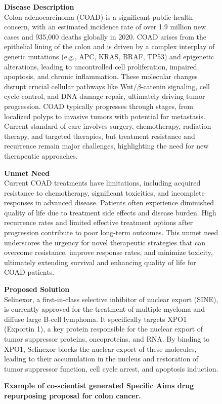 \begin{figure}[htbp!]
\caption{\textbf{Example of co-scientist generated Specific Aims drug repurposing proposal for colon cancer.}}
\label{fig:aim2_1}
\vspace{0.1cm}
\begin{tcolorbox}[title=Selinexor for colon cancer]
\footnotesize
\textbf{Disease Description}\\
Colon adenocarcinoma (COAD) is a significant public health concern, with an estimated incidence rate of over 1.9 million new cases and 935,000 deaths globally in 2020. COAD arises from the epithelial lining of the colon and is driven by a complex interplay of genetic mutations (e.g., APC, KRAS, BRAF, TP53) and epigenetic alterations, leading to uncontrolled cell proliferation, impaired apoptosis, and chronic inflammation. These molecular changes disrupt crucial cellular pathways like Wnt/$\beta$-catenin signaling, cell cycle control, and DNA damage repair, ultimately driving tumor progression. COAD typically progresses through stages, from localized polyps to invasive tumors with potential for metastasis. Current standard of care involves surgery, chemotherapy, radiation therapy, and targeted therapies, but treatment resistance and recurrence remain major challenges, highlighting the need for new therapeutic approaches.

\textbf{Unmet Need}\\
Current COAD treatments have limitations, including acquired resistance to chemotherapy, significant toxicities, and incomplete responses in advanced disease. Patients often experience diminished quality of life due to treatment side effects and disease burden. High recurrence rates and limited effective treatment options after progression contribute to poor long-term outcomes.  This unmet need underscores the urgency for novel therapeutic strategies that can overcome resistance, improve response rates, and minimize toxicity, ultimately extending survival and enhancing quality of life for COAD patients.

\textbf{Proposed Solution}\\
Selinexor, a first-in-class selective inhibitor of nuclear export (SINE), is currently approved for the treatment of multiple myeloma and diffuse large B-cell lymphoma. It specifically targets XPO1 (Exportin 1), a key protein responsible for the nuclear export of tumor suppressor proteins, oncoproteins, and RNA. By binding to XPO1, Selinexor blocks the nuclear export of these molecules, leading to their accumulation in the nucleus and restoration of tumor suppressor function, cell cycle arrest, and apoptosis induction.


\end{tcolorbox}
\end{figure}
